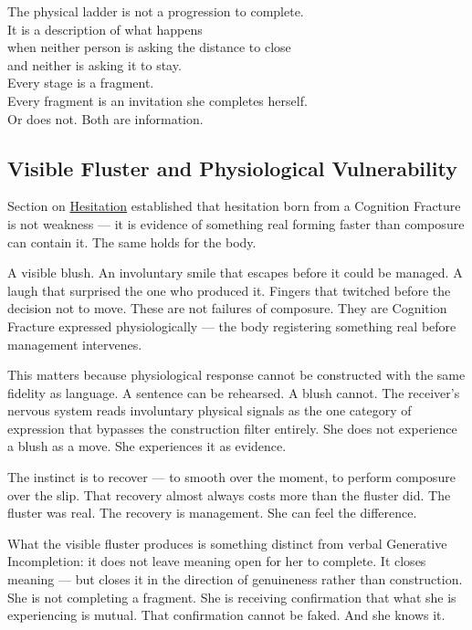 \begin{calloutbox}
The physical ladder is not a progression to complete.\\
It is a description of what happens\\
when neither person is asking the distance to close\\
and neither is asking it to stay.\\[0.4em]
Every stage is a fragment.\\
Every fragment is an invitation she completes herself.\\
Or does not. Both are information.
\end{calloutbox}


\subsection{Visible Fluster and Physiological Vulnerability}

Section on \hyperref[subsec:hesitation]{Hesitation} established that hesitation born from a 
Cognition Fracture is not weakness --- it is evidence of something real 
forming faster than composure can contain it. The same holds for the body.

A visible blush. An involuntary smile that escapes before it could be managed. 
A laugh that surprised the one who produced it. Fingers that twitched before 
the decision not to move. These are not failures of composure. They are 
Cognition Fracture expressed physiologically --- the body registering 
something real before management intervenes.

This matters because physiological response cannot be constructed with the 
same fidelity as language. A sentence can be rehearsed. A blush cannot. 
The receiver's nervous system reads involuntary physical signals as the 
one category of expression that bypasses the construction filter entirely. 
She does not experience a blush as a move. She experiences it as evidence.

The instinct is to recover --- to smooth over the moment, to perform 
composure over the slip. That recovery almost always costs more than 
the fluster did. The fluster was real. The recovery is management. 
She can feel the difference.

What the visible fluster produces is something distinct from verbal 
Generative Incompletion: it does not leave meaning open for her to complete. 
It closes meaning --- but closes it in the direction of genuineness rather 
than construction. She is not completing a fragment. She is receiving 
confirmation that what she is experiencing is mutual. That confirmation 
cannot be faked. And she knows it.


